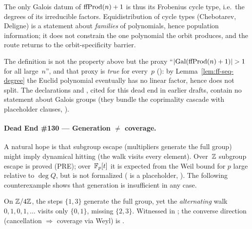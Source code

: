 \noindent The only Galois datum of $\mathrm{ffProd}(n)+1$ is thus its Frobenius
cycle type, i.e.\ the degrees of its irreducible factors.
Equidistribution of cycle types (Chebotarev, Deligne) is a statement
about \emph{families} of polynomials, hence population information; it
does not constrain the one polynomial the orbit produces, and the route
returns to the orbit-specificity barrier.

\begin{remark}
The definition
 is not the
property above but the proxy ``$|\mathrm{Gal}(\mathrm{ffProd}(n)+1)| > 1$ for
all large~$n$'', and that proxy is \emph{true} for every~$p$
(): by
Lemma~\ref{lem:ff-seq-degree} the Euclid polynomial eventually has no
linear factor, hence does not split.  The declarations
 and
, cited for this dead end in
earlier drafts, contain no statement about Galois groups (they bundle the
coprimality cascade with placeholder clauses, \placeholder).
\end{remark}

\paragraph{Dead End \#130 --- Generation $\neq$ coverage.}
A natural hope is that subgroup escape (multipliers generate the full
group) might imply dynamical hitting (the walk visits every element).
Over~$\mathbb{Z}$ subgroup escape is proved (PRE); over~$\mathbb{F}_p[t]$ it is expected
from the Weil bound for $p$ large relative to $\deg Q$, but is not
formalized ( is a placeholder, \placeholder).
The following counterexample shows that generation is insufficient in
any case.

\begin{theorem}
\label{thm:de130}
On $\mathbb{Z}/4\mathbb{Z}$, the steps $\{1, 3\}$ generate the full group, yet the
\emph{alternating} walk $0, 1, 0, 1, \ldots$ visits only $\{0, 1\}$,
missing $\{2, 3\}$.  Witnessed in
;
the converse direction (cancellation $\Rightarrow$ coverage via Weyl)
is
.
\end{theorem}

